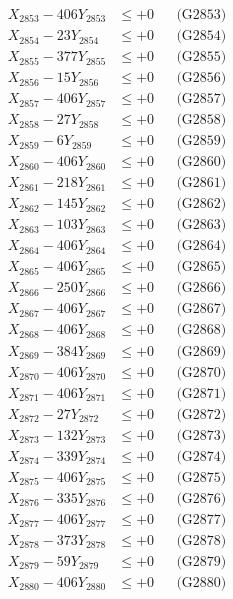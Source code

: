 \documentclass[a4paper,10pt]{article}
\begin{document}
{\begin{align}
X_{2853} - 406Y_{2853} &\leq +0 && \text{(G2853)} \\
X_{2854} - 23Y_{2854} &\leq +0 && \text{(G2854)} \\
X_{2855} - 377Y_{2855} &\leq +0 && \text{(G2855)} \\
X_{2856} - 15Y_{2856} &\leq +0 && \text{(G2856)} \\
X_{2857} - 406Y_{2857} &\leq +0 && \text{(G2857)} \\
X_{2858} - 27Y_{2858} &\leq +0 && \text{(G2858)} \\
X_{2859} - 6Y_{2859} &\leq +0 && \text{(G2859)} \\
X_{2860} - 406Y_{2860} &\leq +0 && \text{(G2860)} \\
\allowbreak
X_{2861} - 218Y_{2861} &\leq +0 && \text{(G2861)} \\
X_{2862} - 145Y_{2862} &\leq +0 && \text{(G2862)} \\
X_{2863} - 103Y_{2863} &\leq +0 && \text{(G2863)} \\
X_{2864} - 406Y_{2864} &\leq +0 && \text{(G2864)} \\
X_{2865} - 406Y_{2865} &\leq +0 && \text{(G2865)} \\
X_{2866} - 250Y_{2866} &\leq +0 && \text{(G2866)} \\
X_{2867} - 406Y_{2867} &\leq +0 && \text{(G2867)} \\
X_{2868} - 406Y_{2868} &\leq +0 && \text{(G2868)} \\
X_{2869} - 384Y_{2869} &\leq +0 && \text{(G2869)} \\
X_{2870} - 406Y_{2870} &\leq +0 && \text{(G2870)} \\
\allowbreak
X_{2871} - 406Y_{2871} &\leq +0 && \text{(G2871)} \\
X_{2872} - 27Y_{2872} &\leq +0 && \text{(G2872)} \\
X_{2873} - 132Y_{2873} &\leq +0 && \text{(G2873)} \\
X_{2874} - 339Y_{2874} &\leq +0 && \text{(G2874)} \\
X_{2875} - 406Y_{2875} &\leq +0 && \text{(G2875)} \\
X_{2876} - 335Y_{2876} &\leq +0 && \text{(G2876)} \\
X_{2877} - 406Y_{2877} &\leq +0 && \text{(G2877)} \\
X_{2878} - 373Y_{2878} &\leq +0 && \text{(G2878)} \\
X_{2879} - 59Y_{2879} &\leq +0 && \text{(G2879)} \\
X_{2880} - 406Y_{2880} &\leq +0 && \text{(G2880)} \\

\end{align}}
\end{document}
